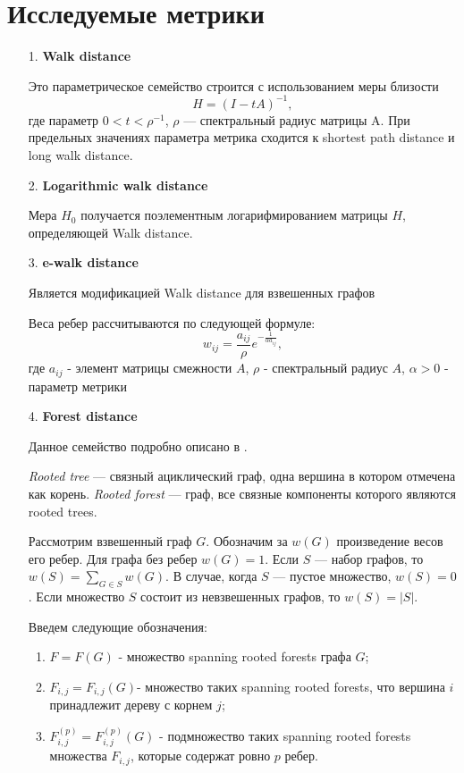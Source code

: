 \section{Исследуемые метрики} \label{sect1_3}
\begin{itemize}
\item[1.] \textbf{Walk distance}

Это параметрическое семейство строится с использованием меры близости 
\begin{equation}
H = (I - tA)^{-1},
\end{equation}
где параметр $0 < t < \rho ^{-1}$, $\rho$ --- спектральный радиус матрицы A. При предельных значениях параметра метрика сходится к shortest path distance и long walk distance. 

\item[2.] \textbf{Logarithmic walk distance}

Мера $H_0$ получается поэлементным логарифмированием матрицы $H$, определяющей Walk distance.

\item[3.] \textbf{e-walk distance}

Является модификацией Walk distance для взвешенных графов 

Веса ребер рассчитываются по следующей формуле: \begin{equation}
w_{ij} = \frac{a_{ij}}{\rho} e^{-\frac{1}{\alpha a_{ij}}},
\end{equation} где $a_{ij}$ - элемент матрицы смежности $A$, $\rho$ - спектральный радиус $A$, $\alpha > 0$ - параметр метрики

\item[4.] \textbf{Forest distance}

Данное семейство подробно описано в \cite{chebotarev2005duality}.

\emph{Rooted tree} --- связный ациклический граф, одна вершина в котором отмечена как корень. \emph{Rooted forest} --- граф, все связные компоненты которого являются rooted trees.

Рассмотрим взвешенный граф $G$. Обозначим за $w(G)$ произведение весов его ребер. Для графа без ребер $w(G) = 1$. Если $S$ --- набор графов, то $w(S) = \sum\limits_{G \in S} w(G)$.  В случае, когда $S$ --- пустое множество, $w(S) = 0$. Если множество $S$ состоит из невзвешенных графов, то $w(S) = |S|$.

Введем следующие обозначения: 

\begin{enumerate}
\item $F = F(G)$ - множество spanning rooted forests графа $G$; 
\item $F_{i,j} = F_{i,j}(G)$- множество таких spanning rooted forests, что вершина $i$ принадлежит дереву с корнем $j$; 
\item $F_{i,j}^{(p)} = F_{i,j}^{(p)}(G)$ - подмножество таких spanning rooted forests множества $F_{i,j}$, которые содержат ровно $p$ ребер.
\end{enumerate}


\end{itemize}
